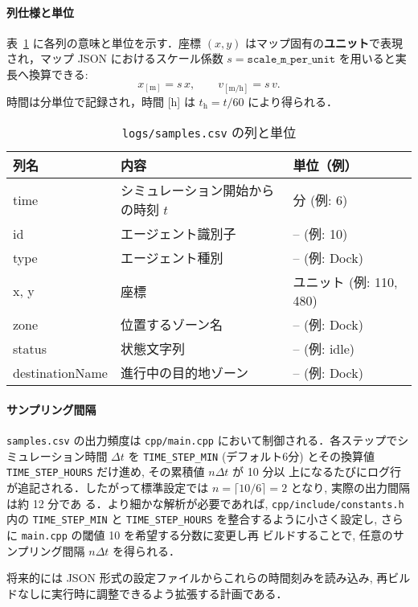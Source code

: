 \documentclass[10pt,letterpaper]{jsarticle}
\begin{document}
\paragraph{列仕様と単位}
表~\ref{tab:samples-columns} に各列の意味と単位を示す．座標 $(x,y)$ はマップ固有の\textbf{ユニット}で表現され，マップ JSON におけるスケール係数 $s=\texttt{scale\_m\_per\_unit}$ を用いると実長へ換算できる:
\[
  x_{\mathrm{[m]}} = s\,x,\qquad v_{\mathrm{[m/h]}} = s\,v.
\]
時間は分単位で記録され，時間 [h] は $t_{\mathrm{h}} = t/60$ により得られる．
\begin{table}[htbp]
  \centering
  \begin{tabular}{lll}
    \toprule
    列名 & 内容 & 単位（例） \\
    \midrule
    time & シミュレーション開始からの時刻 $t$ & 分 (例: 6) \\
    id & エージェント識別子 & -- (例: 10) \\
    type & エージェント種別 & -- (例: Dock) \\
    x, y & 座標 & ユニット (例: 110, 480) \\
    zone & 位置するゾーン名 & -- (例: Dock) \\
    status & 状態文字列 & -- (例: idle) \\
    destinationName & 進行中の目的地ゾーン & -- (例: Dock) \\
    \bottomrule
  \end{tabular}
  \caption{\texttt{logs/samples.csv} の列と単位}
  \label{tab:samples-columns}
\end{table}

\paragraph{サンプリング間隔}
\texttt{samples.csv} の出力頻度は \texttt{cpp/main.cpp} において制御される．各ステップでシミュレーション時間 \(\Delta t\) を
\texttt{TIME\_STEP\_MIN} (デフォルト6分) とその換算値 \texttt{TIME\_STEP\_HOURS} だけ進め, その累積値 \(n\Delta t\) が 10 分以
上になるたびにログ行が追記される．したがって標準設定では \(n=\lceil 10/6 \rceil =2\) となり, 実際の出力間隔は約 12 分であ
る．より細かな解析が必要であれば, \texttt{cpp/include/constants.h} 内の \texttt{TIME\_STEP\_MIN} と
\texttt{TIME\_STEP\_HOURS} を整合するように小さく設定し, さらに \texttt{main.cpp} の閾値 10 を希望する分数に変更し再
ビルドすることで, 任意のサンプリング間隔 \(n\Delta t\) を得られる．

将来的には JSON 形式の設定ファイルからこれらの時間刻みを読み込み, 再ビルドなしに実行時に調整できるよう拡張する計画である．
\end{document}
